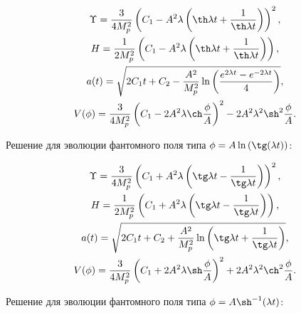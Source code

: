 %

\begin{gather*}

\Upsilon= \frac{3}{4M_p^2}\left(C_1-A^2\lambda\left(\th \lambda t+\frac{1}{\th \lambda t}\right)\right)^2,\\

H=\frac{1}{2M_p^2}\left(C_1-A^2\lambda\left(\th \lambda t+\frac{1}{\th \lambda t}\right)\right),\\

a(t)= \sqrt{2C_1t+C_2-\frac{A^2}{M_p^2} \ln\left( \frac{e^{2\lambda t}-e^{-2\lambda t}}{4} \right)},\\

V(\phi)=\frac{3}{4M_p^2}\left(C_1-2A^2\lambda \ch \frac{\phi}{A}\right)^2

-2A^2\lambda^2 \sh^2 \frac{\phi}{A}.

\end{gather*}





Решение для эволюции фантомного поля типа $ \phi=A\ln \left(\tg (\lambda t)\right) $:

\begin{gather*}

\Upsilon= \frac{3}{4M_p^2}\left(C_1+A^2\lambda\left(\tg \lambda t-\frac{1}{\tg \lambda t}\right)\right)^2,\\

H=\frac{1}{2M_p^2}\left(C_1+A^2\lambda\left(\tg \lambda t-\frac{1}{\tg \lambda t}\right)\right),\\

a(t)= \sqrt{2C_1t+C_2+\frac{A^2}{M_p^2}\ln\left(\tg \lambda t+\frac{1}{\tg \lambda t}\right)},\\

V(\phi)=\frac{3}{4M_p^2}\left(C_1+2A^2\lambda \sh \frac{\phi}{A}\right)^2

+2A^2\lambda^2 \ch^2 \frac{\phi}{A}.

\end{gather*}









Решение для эволюции фантомного поля типа $ \phi=A \sh^{-1} (\lambda t) $:

%

